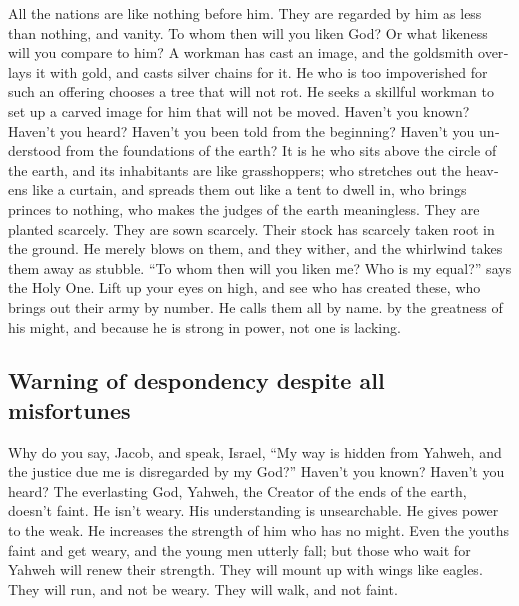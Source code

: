 \begin{paracol}{2}
\begin{otherlanguage}{english}
 All the nations are like nothing before him. They are
regarded by him as less than nothing, and vanity.  To
whom then will you liken God? Or what likeness will you compare to him?
 A workman has cast an image, and the goldsmith overlays
it with gold, and casts silver chains for it.  He who is
too impoverished for such an offering chooses a tree that will not rot.
He seeks a skillful workman to set up a carved image for him that will
not be moved.  Haven't you known? Haven't you heard?
Haven't you been told from the beginning? Haven't you understood from
the foundations of the earth?  It is he who sits above
the circle of the earth, and its inhabitants are like grasshoppers; who
stretches out the heavens like a curtain, and spreads them out like a
tent to dwell in,  who brings princes to nothing, who
makes the judges of the earth meaningless.  They are
planted scarcely. They are sown scarcely. Their stock has scarcely taken
root in the ground. He merely blows on them, and they wither, and the
whirlwind takes them away as stubble.  ``To whom then
will you liken me? Who is my equal?'' says the Holy One. 
Lift up your eyes on high, and see who has created these, who brings out
their army by number. He calls them all by name. by the greatness of his
might, and because he is strong in power, not one is lacking.

\hypertarget{warning-of-despondency-despite-all-misfortunes}{%
\subsection{Warning of despondency despite all
misfortunes}\label{warning-of-despondency-despite-all-misfortunes}}

 Why do you say, Jacob, and speak, Israel, ``My way is
hidden from Yahweh, and the justice due me is disregarded by my God?''
 Haven't you known? Haven't you heard? The everlasting
God, Yahweh, the Creator of the ends of the earth, doesn't faint. He
isn't weary. His understanding is unsearchable.  He gives
power to the weak. He increases the strength of him who has no might.
 Even the youths faint and get weary, and the young men
utterly fall;  but those who wait for Yahweh will renew
their strength. They will mount up with wings like eagles. They will
run, and not be weary. They will walk, and not faint.


\end{otherlanguage}
\end{paracol}
